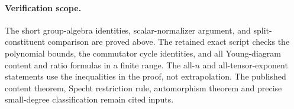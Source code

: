 \paragraph{Verification scope.}
The short group-algebra identities, scalar-normalizer argument,
and split-constituent comparison are proved above. The retained
exact script checks the polynomial bounds, the commutator cycle
identities, and all Young-diagram content and ratio formulas in a
finite range. The all-$n$ and all-tensor-exponent statements use
the inequalities in the proof, not extrapolation. The published
content theorem, Specht restriction rule, automorphism theorem and
precise small-degree classification remain cited inputs.

